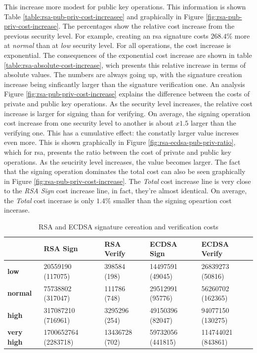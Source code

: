 \documentclass{llncs}
\begin{document}
This increase more modest for public key operations. This information is shown Table \ref{table:rsa-pub-priv-cost-increasee} and graphically 
in Figure \ref{fig:rsa-pub-priv-cost-increase}. 
The percentages show the relative cost increase from the previous security level. For example, creating an \gls{rsa} signature costs 
$268.4\%$ more at \textit{normal} than at \textit{low} security level. For all operations, the cost increase is exponential. 
The consequences of the exponential cost increase are shown in table \ref{table:rsa-absolute-cost-increase}, wich presents this relative increase 
in terms of absolute values. The numbers are always going up, with the signature creation increase being sinficantly larger 
than the signature verification one. An analysis Figure \ref{fig:rsa-pub-priv-cost-increase}
explains the difference between the costs of private and public key operations. As the security level increases, the relative cost
increase is larger for signing than for verifying. On average, the signing operation cost increase from one security level to another 
is about $x1.5$ larger than the verifying one. This has a cumulative effect: the constatly larger value increses even more. 
This is shown graphically in Figure \ref{fig:rsa-ecdsa-pub-priv-ratio}, which for \gls{rsa}, presents the ratio between the cost of private and 
public key operations. As the seucirity level increases, the value becomes larger. The fact that the signing operation dominates the total cost
can also be seen graphically in Figure \ref{fig:rsa-pub-priv-cost-increase}. The \textit{Total} cost increase line is very close to the 
\textit{RSA Sign} cost increase line, in fact, they're almost identical. On average, the \textit{Total} cost incerase is only $1.4\%$ smaller
than the signing opeartion cost incerase.

\begin{table}[]
  \begin{tabular}{|l|l|l|l|l|}
  \hline
                    & \textbf{RSA Sign}    & \textbf{RSA Verify} & \textbf{ECDSA Sign} & \textbf{ECDSA Verify} \\ \hline
  \textbf{low}       & 20559190 (117075)    & 398584 (198)        & 14497591 (49045)    & 26839273 (50816)      \\ \hline
  \textbf{normal}    & 75738802 (317047)    & 111786 (748)       & 29512991 (95776)    & 56260702 (162365)     \\ \hline
  \textbf{high}      & 317087210 (716961)   & 3295296 (254)       & 49150396 (82047)     & 94077150 (130275)     \\ \hline
  \textbf{very high} & 1700652764 (2283718) & 13436728 (702)      & 59732056 (441815)   & 114744021 (843861)    \\ \hline
  \end{tabular}
  \centering \caption{\label{table:rsa-costs-all-sls} RSA and ECDSA signature cereation and verification costs} \end{table}
\end{document}
